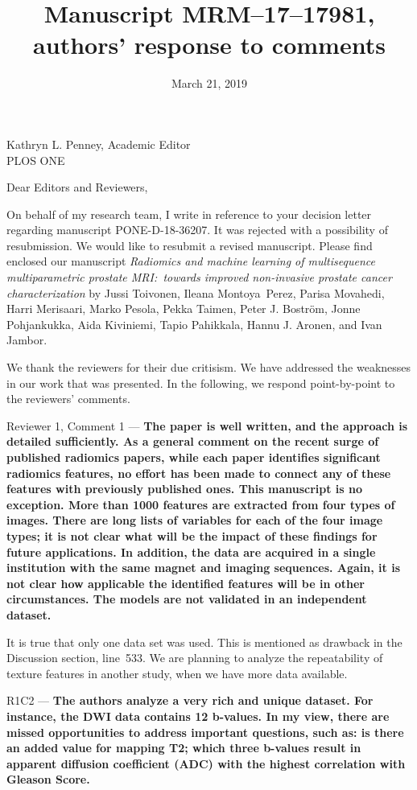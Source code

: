 \documentclass{letter}
\title{Manuscript MRM--17--17981, authors' response to comments}
\date{March 21, 2019}
\newenvironment{comment}[1]%
  {\vspace{5ex}\par\textsf{#1 ---}\ignorespaces\bfseries}%
  {\par\ignorespacesafterend}
\newenvironment{reply}%
  {\vspace{2ex}\par}%
  {\par\upshape}
\begin{document}
\begin{letter}{Kathryn L. Penney, Academic Editor \\ PLOS ONE}
\opening{Dear Editors and Reviewers,}

On behalf of my research team, I write in reference to your decision letter
regarding manuscript PONE-D-18-36207. It was rejected with a possibility of
resubmission. We would like to resubmit a revised manuscript. Please find
enclosed our manuscript \emph{Radiomics and machine learning of multisequence
multiparametric prostate MRI:\ towards improved non-invasive prostate cancer
characterization} by Jussi Toivonen, Ileana Montoya~Perez, Parisa Movahedi,
Harri Merisaari, Marko Pesola, Pekka Taimen, Peter J. Boström, Jonne
Pohjankukka, Aida Kiviniemi, Tapio Pahikkala, Hannu J. Aronen, and Ivan Jambor.

We thank the reviewers for their due critisism. We have addressed the weaknesses
in our work that was presented. In the following, we respond point-by-point to
the reviewers' comments.


\begin{comment}{Reviewer 1, Comment 1}
The paper is well written, and the approach is detailed sufficiently. As a
general comment on the recent surge of published radiomics papers, while each
paper identifies significant radiomics features, no effort has been made to
connect any of these features with previously published ones. This manuscript is
no exception. More than 1000 features are extracted from four types of images.
There are long lists of variables for each of the four image types; it is not
clear what will be the impact of these findings for future applications. In
addition, the data are acquired in a single institution with the same magnet and
imaging sequences. Again, it is not clear how applicable the identified features
will be in other circumstances. The models are not validated in an independent
dataset.
\end{comment}

\begin{reply}
It is true that only one data set was used. This is mentioned as drawback in the
Discussion section, line~533. We are planning to analyze the repeatability of
texture features in another study, when we have more data available.
\end{reply}


\begin{comment}{R1C2}
The authors analyze a very rich and unique dataset. For instance, the DWI data
contains 12 b-values. In my view, there are missed opportunities to address
important questions, such as: is there an added value for mapping T2; which
three b-values result in apparent diffusion coefficient (ADC) with the highest
correlation with Gleason Score.
\end{comment}


\end{letter}
\end{document}
